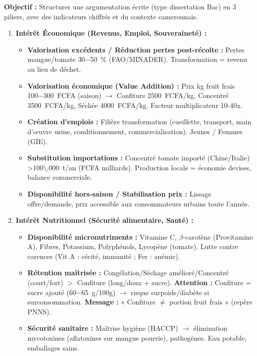 \documentclass[11pt]{article}
\begin{document}
\begin{methode}
    \textbf{Objectif :} Structurer une argumentation écrite (type dissertation Bac) en 3 piliers, avec des indicateurs chiffrés et du contexte camerounais.
    \begin{enumerate}
        \item \textbf{Intérêt Économique (Revenus, Emploi, Souveraineté) :}
            \begin{itemize}
                \item \textbf{Valorisation excédents / Réduction pertes post-récolte :} Pertes mangue/tomate \SI{30-50}{\%} (FAO/MINADER). Transformation = revenu au lieu de déchet.
                \item \textbf{Valorisation économique (Value Addition) :} Prix kg fruit frais \SI{100-300}{FCFA} (saison) $\rightarrow$ Confiture \SI{2500}{FCFA/kg}, Concentré \SI{3500}{FCFA/kg}, Séchée \SI{4000}{FCFA/kg}. Facteur multiplicateur 10-40x.
                \item \textbf{Création d'emplois :} Filière transformation (cueillette, transport, main d'œuvre usine, conditionnement, commercialisation). Jeunes / Femmes (GIE).
                \item \textbf{Substitution importations :} Concentré tomate importé (Chine/Italie) \SI{>100\,000}{t/an} (FCFA milliards). Production locale = économie devises, balance commerciale.
                \item \textbf{Disponibilité hors-saison / Stabilisation prix :} Lissage offre/demande, prix accessible aux consommateurs urbains toute l'année.
            \end{itemize}
        \item \textbf{Intérêt Nutritionnel (Sécurité alimentaire, Santé) :}
            \begin{itemize}
                \item \textbf{Disponibilité micronutriments :} Vitamine C, $\beta$-carotène (Provitamine A), Fibres, Potassium, Polyphénols, Lycopène (tomate). Lutte contre carences (Vit A : cécité, immunité ; Fer : anémie).
                \item \textbf{Rétention maîtrisée :} Congélation/Séchage amélioré/Concentré (court/fort) $>$ Confiture (long/doux + sucre). \textbf{Attention :} Confiture = sucre ajouté (\SI{60-65}{g/100g}) $\rightarrow$ risque surpoids/diabète si surconsommation. \textbf{Message :} « Confiture $\neq$ portion fruit frais » (repère PNNS).
                \item \textbf{Sécurité sanitaire :} Maîtrise hygiène (HACCP) $\rightarrow$ élimination mycotoxines (aflatoxines sur mangue pourrie), pathogènes. Eau potable, emballages sains.

\end{itemize}
\end{enumerate}
\end{methode}
\end{document}
